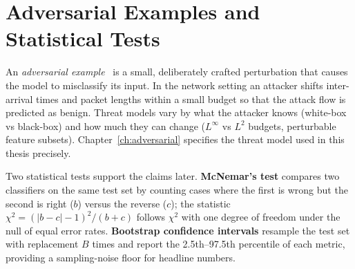 \section{Adversarial Examples and Statistical Tests}

An \textit{adversarial example}~\cite{Goodfellow2015} is a small,
deliberately crafted perturbation that causes the model to misclassify
its input. In the network setting an attacker shifts inter-arrival times
and packet lengths within a small budget so that the attack flow is
predicted as benign. Threat models vary by what the attacker knows
(white-box vs black-box) and how much they can change ($L^\infty$ vs
$L^2$ budgets, perturbable feature subsets). Chapter~\ref{ch:adversarial}
specifies the threat model used in this thesis precisely.

Two statistical tests support the claims later. \textbf{McNemar's test}
compares two classifiers on the same test set by counting cases where the
first is wrong but the second is right ($b$) versus the reverse ($c$);
the statistic $\chi^2 = (\lvert b - c\rvert - 1)^2 / (b + c)$ follows
$\chi^2$ with one degree of freedom under the null of equal error rates.
\textbf{Bootstrap confidence intervals} resample the test set with
replacement $B$ times and report the 2.5th--97.5th percentile of each
metric, providing a sampling-noise floor for headline numbers.
